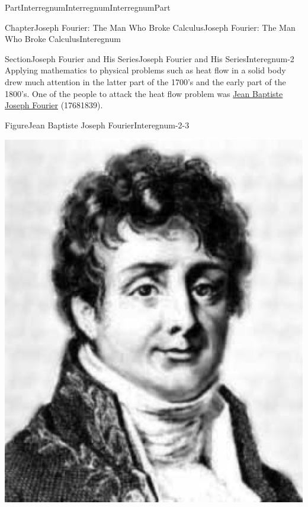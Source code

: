 \documentclass[oneside,10pt,]{book}
\numberwithin{equation}{part}
\begin{document}
\begin{partptx}{Part}{Interregnum}{}{Interregnum}{}{}{InterregnumPart}
\renewcommand*{\partname}{Part}
%
%
\typeout{************************************************}
\typeout{************************************************}
%
\begin{chapterptx}{Chapter}{Joseph Fourier: The Man Who Broke Calculus}{}{Joseph Fourier: The Man Who Broke Calculus}{}{}{Interegnum}
\renewcommand*{\chaptername}{Chapter}
%
%
\typeout{************************************************}
\typeout{************************************************}
%
\begin{sectionptx}{Section}{Joseph Fourier and His Series}{}{Joseph Fourier and His Series}{}{}{Interegnum-2}
Applying mathematics to physical problems such as heat flow in a solid body drew much attention in the latter part of the 1700's and the early part of the 1800's.  One of the people to attack the heat flow problem was \href{https://mathshistory.st-andrews.ac.uk/Biographies/Fourier/}{Jean Baptiste Joseph Fourier} (1768\textendash{}1839).%
\begin{figureptx}{Figure}{Jean Baptiste Joseph Fourier}{Interegnum-2-3}{}%
%
%
\begin{image}{0.325}{0.35}{0.325}{}%
\includegraphics[width=\linewidth]{external/images/Fourier.png}

\end{image}
\end{figureptx}
\end{sectionptx}
\end{chapterptx}
\end{partptx}
\end{document}
